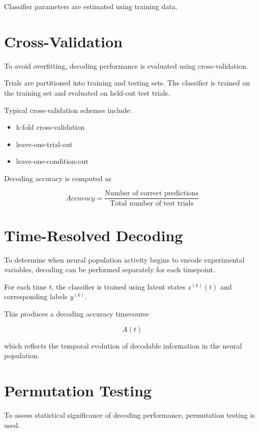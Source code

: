 \documentclass[11pt]{report}
\begin{document}
Classifier parameters are estimated using training data.

\section{Cross-Validation}

To avoid overfitting, decoding performance is evaluated using
cross-validation.

Trials are partitioned into training and testing sets.
The classifier is trained on the training set and evaluated
on held-out test trials.

Typical cross-validation schemes include:

\begin{itemize}
\item k-fold cross-validation
\item leave-one-trial-out
\item leave-one-condition-out
\end{itemize}

Decoding accuracy is computed as

\begin{equation}
Accuracy =
\frac{\text{Number of correct predictions}}
{\text{Total number of test trials}}
\end{equation}

\section{Time-Resolved Decoding}

To determine when neural population activity begins to encode
experimental variables, decoding can be performed separately
for each timepoint.

For each time $t$, the classifier is trained using latent states
$z^{(k)}(t)$ and corresponding labels $y^{(k)}$.

This produces a decoding accuracy timecourse

\begin{equation}
A(t)
\end{equation}

which reflects the temporal evolution of decodable information
in the neural population.

\section{Permutation Testing}

To assess statistical significance of decoding performance,
permutation testing is used.
\end{document}
